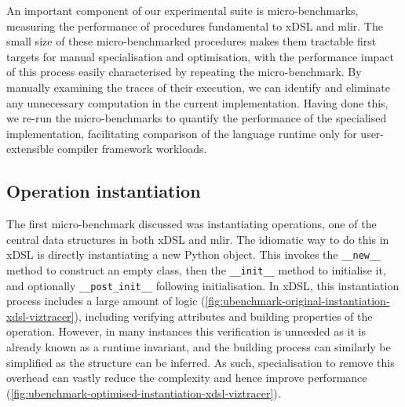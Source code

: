 An important component of our experimental suite is micro-benchmarks, measuring the performance of procedures fundamental to xDSL and \ac{mlir}.
The small size of these micro-benchmarked procedures makes them tractable first targets for manual specialisation and optimisation, with the performance impact of this process easily characterised by repeating the micro-benchmark.
By manually examining the traces of their execution, we can identify and eliminate any unnecessary computation in the current implementation.
Having done this, we re-run the micro-benchmarks to quantify the performance of the specialised implementation, facilitating comparison of the language runtime only for user-extensible compiler framework workloads.


\subsection{Operation instantiation}
\label{sec:specialising-ubenchmarks-instantiation}

The first micro-benchmark discussed was instantiating operations, one of the central data structures in both xDSL and \ac{mlir}.
The idiomatic way to do this in xDSL is directly instantiating a new Python object.
This invokes the \texttt{__new__} method to construct an empty class, then the \texttt{__init__} method to initialise it, and optionally \texttt{__post_init__} following initialisation.
In xDSL, this instantiation process includes a large amount of logic (\autoref{fig:ubenchmark-original-instantiation-xdsl-viztracer}), including verifying attributes and building properties of the operation.
However, in many instances this verification is unneeded as it is already known as a runtime invariant, and the building process can similarly be simplified as the structure can be inferred.
As such, specialisation to remove this overhead can vastly reduce the complexity and hence improve performance (\autoref{fig:ubenchmark-optimised-instantiation-xdsl-viztracer}).

